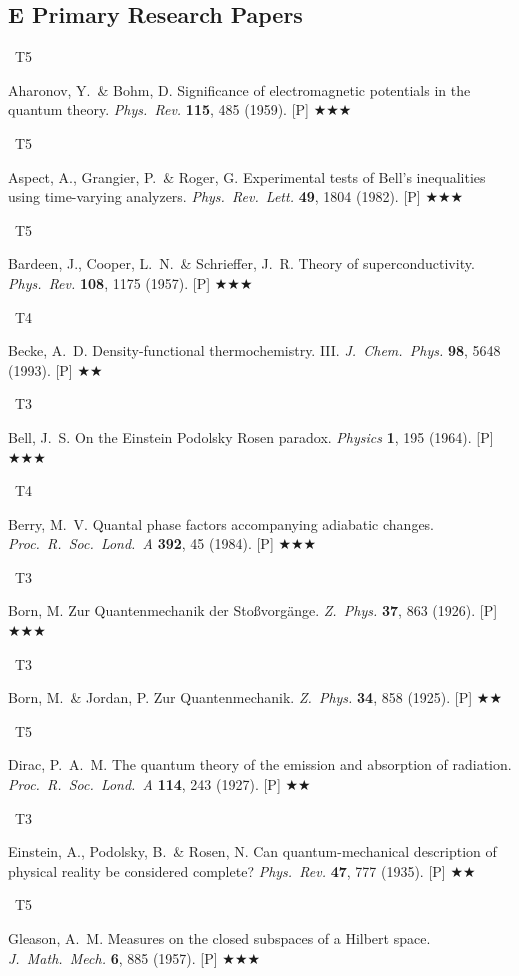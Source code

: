 \documentclass[11pt,a4paper]{article}
\newcommand{\tierbadge}[2]{\colorbox{#1}{\small\bfseries\color{white}\strut\ #2\ }}
\newcommand{\essential}{$\bigstar\bigstar\bigstar$}
\newcommand{\recommended}{$\bigstar\bigstar$}
\begin{document}
\subsection*{E \quad Primary Research Papers}
\begin{tcolorbox}[catbox]
\begin{enumerate}[leftmargin=2.5em,label=\textbf{[E\arabic*]},itemsep=3pt]
  \item \tierbadge{t5red}{T5} Aharonov, Y.\ \& Bohm, D. Significance of electromagnetic potentials in the quantum theory. \textit{Phys.~Rev.} \textbf{115}, 485 (1959). [P] \essential
  \item \tierbadge{t5red}{T5} Aspect, A., Grangier, P.\ \& Roger, G. Experimental tests of Bell's inequalities using time-varying analyzers. \textit{Phys.~Rev.~Lett.} \textbf{49}, 1804 (1982). [P] \essential
  \item \tierbadge{t5red}{T5} Bardeen, J., Cooper, L.~N.\ \& Schrieffer, J.~R. Theory of superconductivity. \textit{Phys.~Rev.} \textbf{108}, 1175 (1957). [P] \essential
  \item \tierbadge{t4orange}{T4} Becke, A.~D. Density-functional thermochemistry. III. \textit{J.~Chem.~Phys.} \textbf{98}, 5648 (1993). [P] \recommended
  \item \tierbadge{t3purple}{T3} Bell, J.~S. On the Einstein Podolsky Rosen paradox. \textit{Physics} \textbf{1}, 195 (1964). [P] \essential
  \item \tierbadge{t4orange}{T4} Berry, M.~V. Quantal phase factors accompanying adiabatic changes. \textit{Proc.~R.~Soc.~Lond.~A} \textbf{392}, 45 (1984). [P] \essential
  \item \tierbadge{t3purple}{T3} Born, M. Zur Quantenmechanik der Sto\ss vorg\"ange. \textit{Z.~Phys.} \textbf{37}, 863 (1926). [P] \essential
  \item \tierbadge{t3purple}{T3} Born, M.\ \& Jordan, P. Zur Quantenmechanik. \textit{Z.~Phys.} \textbf{34}, 858 (1925). [P] \recommended
  \item \tierbadge{t5red}{T5} Dirac, P.~A.~M. The quantum theory of the emission and absorption of radiation. \textit{Proc.~R.~Soc.~Lond.~A} \textbf{114}, 243 (1927). [P] \recommended
  \item \tierbadge{t3purple}{T3} Einstein, A., Podolsky, B.\ \& Rosen, N. Can quantum-mechanical description of physical reality be considered complete? \textit{Phys.~Rev.} \textbf{47}, 777 (1935). [P] \recommended
  \item \tierbadge{t5red}{T5} Gleason, A.~M. Measures on the closed subspaces of a Hilbert space. \textit{J.~Math.~Mech.} \textbf{6}, 885 (1957). [P] \essential

\end{enumerate}
\end{tcolorbox}
\end{document}
